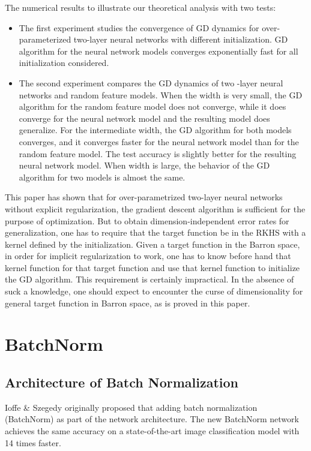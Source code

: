 \documentclass{article}
\begin{document}
The numerical results to illustrate our theoretical analysis with two tests: 
\begin{itemize}
\item The first experiment studies the convergence of GD dynamics for over-parameterized two-layer neural networks with different initialization. GD algorithm for the neural network models converges exponentially fast for all initialization considered.
\item The second experiment compares the GD dynamics of two -layer neural networks and random feature models. When the width is very small, the GD algorithm for the random feature model does not converge, while it does converge for the neural network model and the resulting model does generalize. For the intermediate width, the GD algorithm for both models converges, and it converges faster for the neural network model than for the random feature model. The test accuracy is slightly better for the resulting neural network model. When width is large, the behavior of the GD algorithm for two models is almost the same. 
\end{itemize}

This paper has shown that for over-parametrized two-layer neural networks without explicit regularization, the gradient descent algorithm is sufficient for the purpose of optimization. But to obtain dimension-independent error rates for generalization, one has to require that the target function be in the RKHS with a kernel defined by the initialization. Given a target function in the Barron space, in order for implicit regularization to work, one has to know before hand that kernel function for that target function and use that kernel function to initialize the GD algorithm. This requirement is certainly impractical. In the absence of suck a knowledge, one should expect to encounter the curse of dimensionality for general target function in Barron space, as is proved in this paper. 

\section{BatchNorm}
\label{label:BatchNorm}

\subsection{Architecture of Batch Normalization}


Ioffe \& Szegedy \cite{batchnorm} originally proposed that adding batch normalization (BatchNorm) as part of the network architecture. The new BatchNorm network achieves the same accuracy on a state-of-the-art image classification model with 14 times faster.
\end{document}
